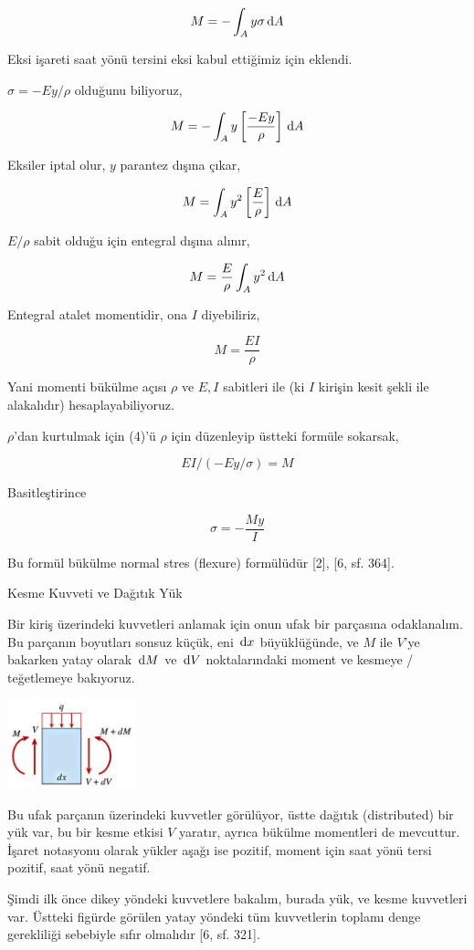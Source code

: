 \documentclass[12pt,fleqn]{article}\usepackage{../../common}
\begin{document}
$$
M = - \int_A y \sigma \,\mathrm{d} A
$$

Eksi işareti saat yönü tersini eksi kabul ettiğimiz için eklendi.

$\sigma = -Ey/\rho$ olduğunu biliyoruz,

$$
M = - \int_A y \left[ \frac{-Ey}{\rho} \right] \,\mathrm{d} A
$$

Eksiler iptal olur, $y$ parantez dışına çıkar,

$$
M = \int_A y^2 \left[ \frac{E}{\rho} \right] \,\mathrm{d} A
$$

$E/\rho$ sabit olduğu için entegral dışına alınır,

$$
M = \frac{E}{\rho} \int_A y^2 \,\mathrm{d} A
$$

Entegral atalet momentidir, ona $I$ diyebiliriz, 

$$
M = \frac{EI}{\rho}
$$

Yani momenti bükülme açısı $\rho$ ve $E,I$ sabitleri ile (ki $I$ kirişin kesit
şekli ile alakalıdır) hesaplayabiliyoruz.

$\rho$'dan kurtulmak için (4)'ü $\rho$ için düzenleyip üstteki formüle sokarsak,

$$
EI / (-Ey / \sigma )  = M
$$

Basitleştirince

$$
\sigma = - \frac{M y}{I}
$$

Bu formül bükülme normal stres (flexure) formülüdür [2], [6, sf. 364].

Kesme Kuvveti ve Dağıtık Yük

Bir kiriş üzerindeki kuvvetleri anlamak için onun ufak bir parçasına
odaklanalım. Bu parçanın boyutları sonsuz küçük, eni $\,\mathrm{d} x$ büyüklüğünde, ve
$M$ ile $V$'ye bakarken yatay olarak $\,\mathrm{d} M$ ve $\,\mathrm{d} V$ noktalarındaki moment ve
kesmeye / teğetlemeye bakıyoruz.

\includegraphics[width=10em]{phy_020_strs_02_10.jpg}

Bu ufak parçanın üzerindeki kuvvetler görülüyor, üstte dağıtık (distributed) bir
yük var, bu bir kesme etkisi $V$ yaratır, ayrıca bükülme momentleri de
mevcuttur. İşaret notasyonu olarak yükler aşağı ise pozitif, moment için
saat yönü tersi pozitif, saat yönü negatif.

Şimdi ilk önce dikey yöndeki kuvvetlere bakalım, burada yük, ve kesme
kuvvetleri var. Üstteki figürde görülen yatay yöndeki tüm kuvvetlerin toplamı
denge gerekliliği sebebiyle sıfır olmalıdır [6, sf. 321].
\end{document}

